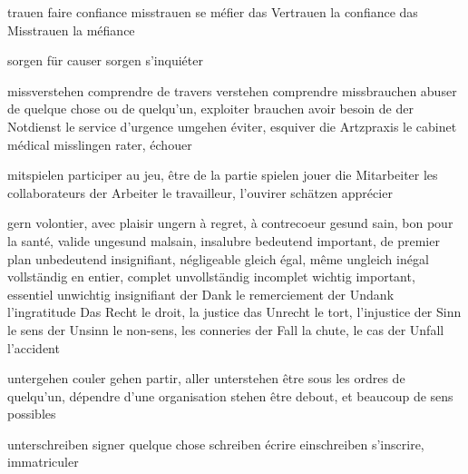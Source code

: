trauen                           faire confiance
misstrauen                       se méfier
das Vertrauen                    la confiance
das Misstrauen                   la méfiance

sorgen für                       causer
sorgen                           s'inquiéter

missverstehen                    comprendre de travers
verstehen                        comprendre
missbrauchen                     abuser de quelque chose ou de quelqu'un, exploiter
brauchen                         avoir besoin de
der Notdienst                    le service d'urgence
umgehen                          éviter, esquiver
die Artzpraxis                   le cabinet médical
misslingen                       rater, échouer

mitspielen                       participer au jeu, être de la partie
spielen                          jouer
die Mitarbeiter                  les collaborateurs
der Arbeiter                     le travailleur, l'ouvirer
schätzen                         apprécier

gern                             volontier, avec plaisir
ungern                           à regret, à contrecoeur
gesund                           sain, bon pour la santé, valide
ungesund                         malsain, insalubre
bedeutend                        important, de premier plan
unbedeutend                      insignifiant, négligeable
gleich                           égal, même
ungleich                         inégal
vollständig                      en entier, complet
unvollständig                    incomplet
wichtig                          important, essentiel
unwichtig                        insignifiant
der Dank                         le remerciement
der Undank                       l'ingratitude
Das Recht                        le droit, la justice
das Unrecht                      le tort, l'injustice
der Sinn                         le sens
der Unsinn                       le non-sens, les conneries
der Fall                         la chute, le cas
der Unfall                       l'accident

untergehen                       couler
gehen                            partir, aller
unterstehen                      être sous les ordres de quelqu'un, dépendre d'une organisation
stehen                           être debout, et beaucoup de sens possibles

unterschreiben                   signer quelque chose
schreiben                        écrire
einschreiben                     s'inscrire, immatriculer

